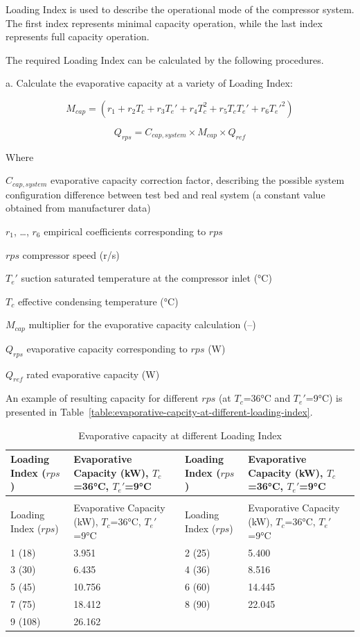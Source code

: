 Loading Index is used to describe the operational mode of the compressor system. The first index represents minimal capacity operation, while the last index represents full capacity operation. 

The required Loading Index can be calculated by the following procedures. 

a. Calculate the evaporative capacity at a variety of Loading Index:

\begin{equation}M_{cap}=(r_1+r_2T_c+r_3{T_e}'+r_4T_c^2+r_5T_c{T_e}'+r_6{T_e}'^2)\end{equation}

\begin{equation}Q_{rps}=C_{cap,system} \times M_{cap} \times Q_{ref} \end{equation}

Where	

$C_{cap,system}$ evaporative capacity correction factor, describing the possible system configuration difference between test bed and real system (a constant value obtained from manufacturer data)  

$r_1$, \ldots, $r_6$ empirical coefficients corresponding to $rps$  

$rps$	compressor speed (r/s) 

${T_e}'$ suction saturated temperature at the compressor inlet (°C)

$T_c$	effective condensing temperature (°C)

$M_{cap}$	multiplier for the evaporative capacity calculation (--)

$Q_{rps}$	evaporative capacity corresponding to $rps$ (W) 

$Q_{ref}$	rated evaporative capacity (W) 

An example of resulting capacity for different $rps$ (at $T_c$=36°C and ${T_e}'$=9°C) is presented in Table~\ref{table:evaporative-capcity-at-different-loading-index}.

\begin{longtable}[c]{>{\raggedright}p{1.5in}>{\raggedright}p{1.5in}>{\raggedright}p{1.5in}>{\raggedright}p{1.5in}}
\caption{Evaporative capacity at different Loading Index \label{table:evaporative-capacity-at-different-loading-index}} \tabularnewline
\toprule 
Loading Index ($rps$) & Evaporative Capacity (kW), $T_c$=36°C, ${T_e}'$=9°C & Loading Index ($rps$) & Evaporative Capacity (kW), $T_c$=36°C, ${T_e}'$=9°C \tabularnewline
\midrule
\endfirsthead

\caption[]{Evaporative capacity at different Loading Index} \tabularnewline
\toprule 
Loading Index ($rps$) & Evaporative Capacity (kW), $T_c$=36°C, ${T_e}'$=9°C & Loading Index ($rps$) & Evaporative Capacity (kW), $T_c$=36°C, ${T_e}'$=9°C \tabularnewline
\midrule
\endhead

1 (18)  & 3.951  & 2 (25) & 5.400  \tabularnewline
3 (30)  & 6.435  & 4 (36) & 8.516  \tabularnewline
5 (45)  & 10.756 & 6 (60) & 14.445 \tabularnewline
7 (75)  & 18.412 & 8 (90) & 22.045 \tabularnewline
9 (108) & 26.162 &        &        \tabularnewline
\bottomrule
\end{longtable}

